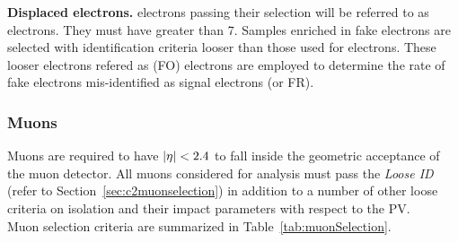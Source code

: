 \textbf {Displaced electrons.}
\Displ electrons passing their selection will be referred to as
\tD electrons.
They must have \pt greater than 7\GeV.
Samples enriched in fake electrons are selected with
identification criteria looser than those used for \tD
electrons. These looser electrons refered as \fo
(FO) electrons are employed to determine the rate of fake electrons
mis-identified as signal electrons (\fr or FR).
\begin{table}[h!]
  \centering
  \caption{\label{tab:electronSelection} Requirements for an electron
    to pass each of the defined selection working points. Variables
    defined in Section~\ref{sec:c2variables}.}
\end{table}

\subsubsection{Muons}\label{sec:llmuon}
Muons are required to have
$|\eta|<2.4$ to fall inside the geometric acceptance of the muon
detector.
All muons considered for analysis must pass the \emph{Loose ID} (refer
to Section~\ref{sec:c2muonselection}) in addition to a number
of other loose criteria on isolation and their impact parameters with
respect to the PV.\\
Muon selection criteria are summarized in
Table~\ref{tab:muonSelection}.

